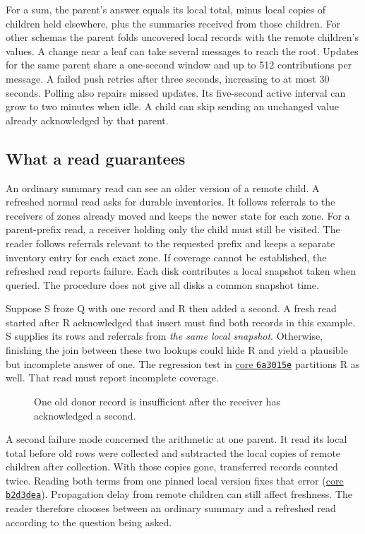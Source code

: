 \documentclass[11pt]{article}
\begin{document}
For a sum, the parent's answer equals its local total, minus local copies of children held elsewhere, plus the summaries received from those children. For other schemas the parent folds uncovered local records with the remote children's values. A change near a leaf can take several messages to reach the root. Updates for the same parent share a one-second window and up to 512 contributions per message. A failed push retries after three seconds, increasing to at most 30 seconds. Polling also repairs missed updates. Its five-second active interval can grow to two minutes when idle. A child can skip sending an unchanged value already acknowledged by that parent.

\subsection{What a read guarantees}\hypertarget{ix:read-consistency}{}
An ordinary summary read can see an older version of a remote child. A refreshed normal read asks for durable inventories. It follows referrals to the receivers of zones already moved and keeps the newer state for each zone. For a parent-prefix read, a receiver holding only the child must still be visited. The reader follows referrals relevant to the requested prefix and keeps a separate inventory entry for each exact zone. If coverage cannot be established, the refreshed read reports failure. Each disk contributes a local snapshot taken when queried. The procedure does not give all disks a common snapshot time.

Suppose S froze Q with one record and R then added a second. A fresh read started after R acknowledged that insert must find both records in this example. S supplies its rows and referrals from \emph{the same local snapshot}. Otherwise, finishing the join between these two lookups could hide R and yield a plausible but incomplete answer of one. The regression test in \href{https://github.com/indexus/core/commit/6a3015e}{core \texttt{6a3015e}} partitions R as well. That read must report incomplete coverage.

\begin{figure}[H]
    \centering
    \caption{One old donor record is insufficient after the receiver has acknowledged a second.}
\end{figure}

A second failure mode concerned the arithmetic at one parent. It read its local total before old rows were collected and subtracted the local copies of remote children after collection. With those copies gone, transferred records counted twice. Reading both terms from one pinned local version fixes that error (\href{https://github.com/indexus/core/commit/b2d3dea}{core \texttt{b2d3dea}}). Propagation delay from remote children can still affect freshness. The reader therefore chooses between an ordinary summary and a refreshed read according to the question being asked.
\end{document}
